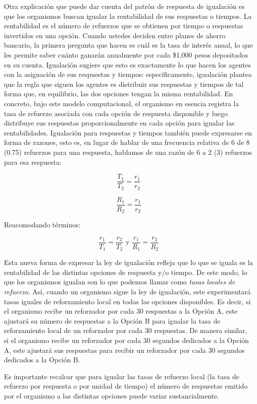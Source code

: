 \documentclass[
  letterpaper,
]{book}
\begin{document}
Otra explicación que puede dar cuenta del patrón de respuesta de
igualación es que los organismos buscan igualar la rentabilidad de sus
respuestas o tiempos. La rentabilidad es el número de refuerzos que se
obtienen por tiempo o respuestas invertidos en una opción. Cuando
ustedes deciden entre planes de ahorro bancario, la primera pregunta que
hacen es cuál es la tasa de interés anual, lo que les permite saber
cuánto ganarán anualmente por cada \$1,000 pesos depositados en su
cuenta. Igualación sugiere que esto es exactamente lo que hacen los
agentes con la asignación de sus respuestas y tiempos: específicamente,
igualación plantea que la regla que siguen los agentes es distribuir sus
respuestas y tiempos de tal forma que, en equilibrio, las dos opciones
tengan la misma rentabilidad. En concreto, bajo este modelo
computacional, el organismo en esencia registra la tasa de refuerzo
asociada con cada opción de respuesta disponible y luego distribuye sus
respuestas proporcionalmente en cada opción para igualar las
rentabilidades. Igualación para respuestas y tiempos también puede
expresarse en forma de razones, esto es, en lugar de hablar de una
frecuencia relativa de 6 de 8 (0.75) refuerzos para una respuesta,
hablamos de una razón de 6 a 2 (3) refuerzos para esa respuesta:

\[
\frac {T_1} {T_2} = \frac {r_1} {r_2}
\]

\[
\frac {R_1} {R_2} = \frac {r_1} {r_2}
\]

Reacomodando términos:

\[
\frac {r_1}{T_1} = \frac {r_2} {T_2} \text{ y } \frac {r_1}{R_1} = \frac {r_2} {R_2}
\]

Esta nueva forma de expresar la ley de igualación refleja que lo que se
iguala es la rentabilidad de las distintas opciones de respuesta y/o
tiempo. De este modo, lo que los organismos igualan son lo que podemos
llamar como \emph{tasas locales de refuerzo}. Así, cuando un organismo
sigue la ley de igualación, este experimentará tasas iguales de
reforzamiento local en todas las opciones disponibles. Es decir, si el
organismo recibe un reforzador por cada 30 respuestas a la Opción A,
este ajustará su número de respuestas a la Opción B para igualar la tasa
de reforzamiento local de un reforzador por cada 30 respuestas. De
manera similar, si el organismo recibe un reforzador por cada 30
segundos dedicados a la Opción A, este ajustará sus respuestas para
recibir un reforzador por cada 30 segundos dedicados a la Opción B.

Es importante recalcar que para igualar las tasas de refuerzo local (la
tasa de refuerzo por respuesta o por unidad de tiempo) el número de
respuestas emitido por el organismo a las distintas opciones puede
variar sustancialmente.
\end{document}
